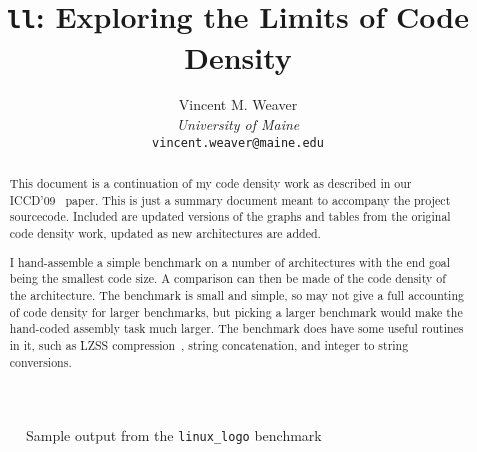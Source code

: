 \documentclass{article}[10pt]
\begin{document}

\title{\LARGE \bf
{\tt ll}: Exploring the Limits of Code Density
}

\author{ \parbox{3 in}{\centering Vincent M. Weaver\\
         \textit{University of Maine}\\
         {\tt vincent.weaver@maine.edu}}
}

\maketitle

\begin{abstract}
This document is a continuation of my code density work as described
in our ICCD'09~\cite{weaver+:iccd09} paper.  
This is just a summary document meant to accompany the project sourcecode.  
Included are updated versions of the graphs and tables from the original
code density work, updated as new architectures are added.

I hand-assemble a simple benchmark on a number of architectures with
the end goal being the smallest code size.  
A comparison can then be made of the code density of the architecture.  
The benchmark is small and simple, so may not give a full accounting of 
code density for larger benchmarks, but picking a larger benchmark would 
make the hand-coded assembly task much larger.  
The benchmark does have some useful routines in it, such as 
LZSS compression~\cite{ziv+:lz77,storer+:lzss82}, 
string concatenation, and integer to string conversions.

\end{abstract}

\begin{figure}[tbp]
\begin{center}
\end{center}
\caption{Sample output from the {\tt linux\_logo} benchmark}
\label{figure:ll}
\end{figure}

%
%
\end{document}
